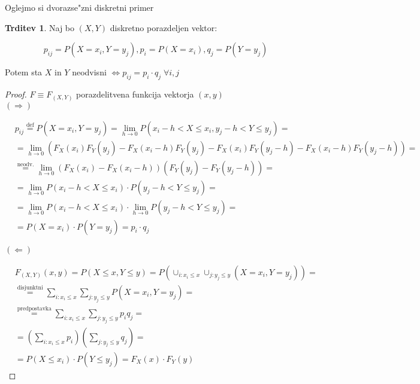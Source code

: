 \documentclass[a4paper,12pt]{article}
\theoremstyle{definition}
\newtheorem{claim}[counter]{Trditev}
\theoremstyle{remark}
\begin{document}
Oglejmo si dvorazse"zni diskretni primer

\begin{claim}
    Naj bo $(X,Y)$ diskretno porazdeljen vektor:

    \begin{equation*}
        p_{ij} = P(X = x_i, Y = y_j), p_i = P(X = x_i), q_j = P(Y = y_j)
    \end{equation*}

    Potem sta $X$ in $Y$ neodvisni $\iff p_{ij} = p_i \cdot q_j \; \forall i,j$
\end{claim}

\begin{proof}
    $F \equiv F_{(X,Y)}$ porazdelitvena funkcija vektorja $(x,y)$ \\
    $(\Rightarrow)$

    \begin{align*}
        &p_{ij} \stackrel{\text{def}}{=} P(X = x_i, Y = y_j) =
            \lim_{h \to 0} P(x_i - h < X \leq x_i, y_j - h < Y \leq y_j) = \\
        &= \lim_{h \to 0} (F_X(x_i) F_Y(y_j) - F_X(x_i - h) F_Y(y_j) -
            F_X(x_i) F_Y(y_j - h) - F_X(x_i - h) F_Y(y_j - h)) = \\
        &\stackrel{\text{neodv.}}{=} \lim_{h \to 0} (F_X(x_i) - F_X(x_i - h)) (F_Y(y_j) - F_Y(y_j - h)) = \\
        &= \lim_{h \to 0} P(x_i - h < X \leq x_i) \cdot P(y_j - h < Y \leq y_j) = \\
        &= \lim_{h \to 0} P(x_i - h < X \leq x_i) \cdot \lim_{h \to 0} P(y_j - h < Y \leq y_j) = \\
        &= P(X = x_i) \cdot P(Y = y_j) = p_i \cdot q_j
    \end{align*}

    $(\Leftarrow)$

    \begin{align*}
        &F_{(X,Y)}(x,y) = P(X \leq x, Y \leq y) = P(\cup_{i: x_i \leq x} \cup_{j: y_j \leq y} (X = x_i, Y = y_j)) = \\
        &\stackrel{\text{disjunktni}}{=} \sum_{i: x_i \leq x} \sum_{j: y_j \leq y} P(X = x_i, Y = y_j) = \\
        &\stackrel{\text{predpostavka}}{=} \sum_{i: x_i \leq x} \sum_{j: y_j \leq y} p_i q_j = \\
        &= (\sum_{i: x_i \leq x} p_i) (\sum_{j: y_j \leq y} q_j) = \\
        &= P(X \leq x_i) \cdot P(Y \leq y_j) = F_X(x) \cdot F_Y(y)
    \end{align*}
\end{proof}
\end{document}
